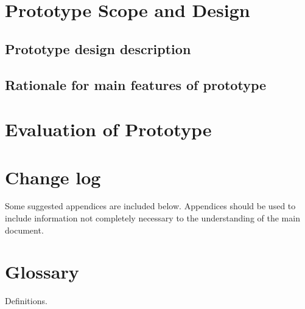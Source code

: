 \documentclass{l3deliverable}
\begin{document}
\section{Prototype Scope and Design}


\subsection{Prototype design description}

\subsection{Rationale for main features of prototype}


\section{Evaluation of Prototype}


\section{Change log}


\appendix

Some suggested appendices are included below. Appendices should be
used to include information not completely necessary to the
understanding of the main document.

\section{Glossary}

Definitions.
\end{document}
